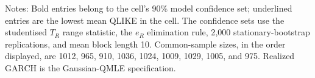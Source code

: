 \begin{table}[htbp]
\centering
\caption{Mean QLIKE and 90\% model confidence sets.}
\label{tab:primary-qlike-mcs}
\small
\setlength{\tabcolsep}{2.5pt}
\vspace{0.5em}
\begin{minipage}{\textwidth}
\footnotesize
Notes: Bold entries belong to the cell's 90\% model confidence set; underlined entries are the lowest mean QLIKE in the cell. The confidence sets use the studentised $T_R$ range statistic, the $e_R$ elimination rule, 2{,}000 stationary-bootstrap replications, and mean block length 10. Common-sample sizes, in the order displayed, are 1012, 965, 910, 1036, 1024, 1009, 1029, 1005, and 975. Realized GARCH is the Gaussian-QMLE specification.
\end{minipage}
\end{table}
